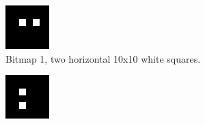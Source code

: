 \documentclass[12pt]{article}
\begin{document}
\begin{figure}
\centering
\begin{subfigure}[b]{.3\linewidth}
\includegraphics[width=\linewidth]{squares-horizontal.png}
\caption{Bitmap 1, two horizontal 10x10 white squares.}
\label{fig:squares-horizontal}
\end{subfigure}
\hspace{2mm}
\begin{subfigure}[b]{.3\linewidth}
\includegraphics[width=\linewidth]{squares-vertical.png}

\end{subfigure}
\end{figure}
\end{document}
